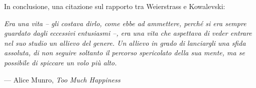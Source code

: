 \documentclass[serif,notheorems]{beamer}
\theoremstyle{definition} %
\theoremstyle{remark}
\begin{document}
\begin{frame}
In conclusione, una citazione sul rapporto tra Weierstrass e Kowalevski:\\
\begin{center}
\textit{
Era una vita -- gli costava dirlo, come ebbe ad ammettere,
perché si era sempre guardato dagli eccessivi entusiasmi --, era una vita
che aspettava di veder entrare nel suo studio un allievo del genere. 
Un allievo in grado di lanciargli una sfida assoluta, 
di non seguire soltanto il percorso spericolato della sua mente, 
ma se possibile di spiccare un volo più alto.
}
\end{center}
\null\hfill --- Alice Munro, \textit{Too Much Happiness}
\end{frame}
\end{document}

